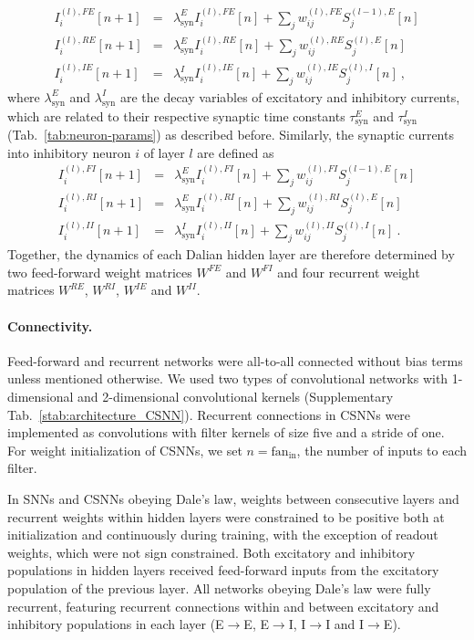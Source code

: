 \documentclass[11pt,a4paper]{article}
\begin{document}
\begin{eqnarray}
	 I^{(l), FE}_i[n+1] &=& \lambda^{E}_{\text{syn}} I^{(l), FE}_i[n] + \sum_j w_{ij}^{(l), FE}S^{(l-1), E}_j[n] \\
	 I^{(l), RE}_i[n+1] &=& \lambda^{E}_{\text{syn}} I^{(l), RE}_i[n] + \sum_j w_{ij}^{(l), RE}S^{(l), E}_j[n] \\
	 I^{(l), IE}_i[n+1] &=& \lambda^{I}_{\text{syn}} I^{(l), IE}_i[n] + \sum_j w_{ij}^{(l), IE}S^{(l), I}_j[n] ~,
\end{eqnarray}
where $\lambda^{E}_{\text{syn}}$ and $\lambda^{I}_{\text{syn}}$ are the decay variables of excitatory and inhibitory currents, which are related to their respective synaptic time constants $\tau^E_{\text{syn}}$ and $\tau^I_{\text{syn}}$ (Tab.~\ref{tab:neuron-params}) as described before. 
Similarly, the synaptic currents into inhibitory neuron $i$ of layer $l$ are defined as
\begin{eqnarray}
	 I^{(l), FI}_i[n+1] &=& \lambda^{E}_{\text{syn}} I^{(l), FI}_i[n] + \sum_j w_{ij}^{(l), FI}S^{(l-1), E}_j[n] \\
	 I^{(l), RI}_i[n+1] &=& \lambda^{E}_{\text{syn}} I^{(l), RI}_i[n] + \sum_j w_{ij}^{(l), RI}S^{(l), E}_j[n] \\
	 I^{(l), II}_i[n+1] &=& \lambda^{I}_{\text{syn}} I^{(l), II}_i[n] + \sum_j w_{ij}^{(l), II}S^{(l), I}_j[n] ~.
\end{eqnarray}
Together, the dynamics of each Dalian hidden layer are therefore determined by two feed-forward weight matrices $W^{FE}$ and $W^{FI}$ and four recurrent weight matrices $W^{RE}$, $W^{RI}$, $W^{IE}$ and $W^{II}$.



\paragraph{Connectivity.} 
Feed-forward and recurrent networks were all-to-all connected without bias terms unless mentioned otherwise.  
We used two types of  convolutional networks with 1-dimensional and 2-dimensional convolutional kernels (Supplementary Tab.~\ref{stab:architecture_CSNN}). 
Recurrent connections in \acp{CSNN} were implemented as convolutions with filter kernels of size five and a stride of one. For weight initialization of \acp{CSNN}, we set $n=\text{fan}_\text{in}$, the number of inputs to each filter. 

In \acp{SNN} and \acp{CSNN} obeying Dale's law, weights between consecutive layers and recurrent weights within hidden layers were constrained to be positive both at initialization and continuously during training, with the exception of readout weights, which were not sign constrained.
Both excitatory and inhibitory populations in hidden layers received feed-forward inputs from the excitatory population of the previous layer. 
All networks obeying Dale's law were fully recurrent, featuring recurrent connections within and between excitatory and inhibitory populations in each layer (E$\rightarrow$E, E$\rightarrow$I, I$\rightarrow$I and I$\rightarrow$E). 
\end{document}
